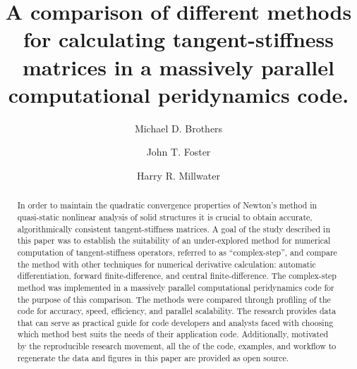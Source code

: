 \documentclass[preprint,12pt]{elsarticle}
\begin{document}
\sloppy

\begin{frontmatter}


\author{Michael D. Brothers}
\author{John T. Foster}

\author{Harry R. Millwater\corref{}}
\address{Mechanical Engineering Department, The University of Texas at San Antonio}


\title{A comparison of different methods for calculating tangent-stiffness matrices in a massively parallel computational peridynamics code.}


\begin{abstract} %

In order to maintain the quadratic convergence properties of Newton's method in
quasi-static nonlinear analysis of solid structures it is crucial to obtain
accurate, algorithmically consistent tangent-stiffness matrices. A goal of the
study described in this paper was to establish the suitability of an
under-explored method for numerical computation of tangent-stiffness operators,
referred to as ``complex-step'', and compare the 
 method with other techniques for numerical derivative
calculation: automatic differentiation, forward finite-difference, and central
finite-difference. The complex-step method was   implemented in a massively
parallel computational peridynamics code for the purpose of this comparison.
The methods were compared through profiling of the code for accuracy,
speed, efficiency, and parallel scalability. The research provides data that
can serve as practical guide for code developers and analysts faced with
choosing which method best suits the needs of their application code.
Additionally, motivated by the reproducible research movement, all the of the
code, examples, and workflow to regenerate the data and figures in this paper
are provided as open source.



\end{abstract}
\end{frontmatter}
\end{document}

